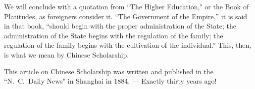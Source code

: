 We will conclude with a quotation from ``The Higher Education," or the Book of Platitudes, as foreigners consider it.
``The Government of the Empire,'' it is said in that book, ``should begin with the proper administration of the State; the administration of the State begins with the regulation of the family; the regulation of the family begins with the cultivation of the individual.''
This, then, is what we mean by Chinese Scholarship.

\vspace{0.2cm}
{\footnotesize This article on Chinese Scholarship was written and published in the ``N.~C.~Daily News" in Shanghai in 1884. --- Exactly thirty years ago!}
